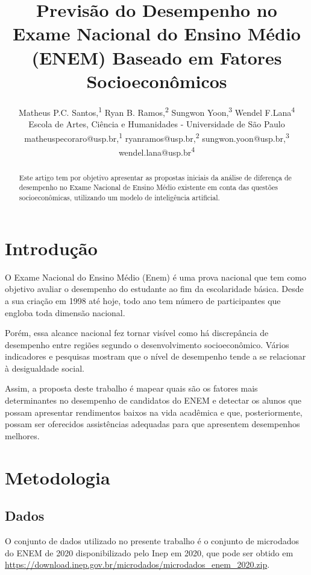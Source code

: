 \documentclass[letterpaper]{article} %
\title{Previsão do Desempenho no Exame Nacional do Ensino Médio (ENEM) Baseado em Fatores Socioeconômicos}
\author{Matheus P.C. Santos,\textsuperscript{\rm 1} Ryan B. Ramos,\textsuperscript{\rm 2} Sungwon Yoon,\textsuperscript{\rm 3} Wendel F.Lana\textsuperscript{\rm 4} \\ %
Escola de Artes, Ciência e Humanidades - Universidade de São Paulo \\
matheuspecoraro@usp.br,\textsuperscript{\rm 1} ryanramos@usp.br,\textsuperscript{\rm 2} sungwon.yoon@usp.br,\textsuperscript{\rm 3} wendel.lana@usp.br\textsuperscript{\rm 4} %
}
\begin{document}
\maketitle

\begin{abstract}

Este artigo tem por objetivo apresentar as propostas iniciais da análise de diferença de desempenho no Exame Nacional de Ensino Médio existente em conta das questões socioeconômicas, utilizando um modelo de inteligência artificial. 

\end{abstract}



\section{Introdução}

O Exame Nacional do Ensino Médio (Enem) é uma prova nacional que tem como objetivo avaliar o desempenho do estudante ao fim da escolaridade básica. Desde a sua criação em 1998 até hoje, todo ano tem número de participantes que engloba toda dimensão nacional.

Porém, essa alcance nacional fez tornar visível como há discrepância de desempenho entre regiões segundo o desenvolvimento socioeconômico. Vários indicadores e pesquisas mostram que o nível de desempenho tende a se relacionar à desigualdade social.


Assim, a proposta deste trabalho é mapear quais são os fatores mais determinantes no desempenho de candidatos do ENEM e detectar os alunos que possam apresentar rendimentos baixos na vida acadêmica e que, posteriormente, possam ser oferecidos assistências adequadas para que apresentem desempenhos melhores.




\section{Metodologia}

\subsection{Dados}

O conjunto de dados utilizado no presente trabalho é o conjunto de microdados do ENEM de 2020 disponibilizado pelo Inep em 2020, que pode ser obtido em \url{https://download.inep.gov.br/microdados/microdados_enem_2020.zip}.
\end{document}
